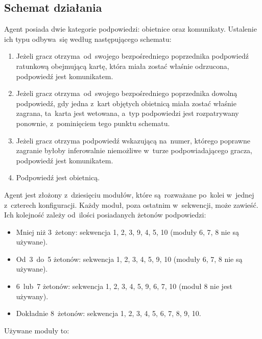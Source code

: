 \documentclass[declaration,shortabstract,inz]{iithesis}
\begin{document}
\subsection*{Schemat działania}

Agent posiada dwie kategorie podpowiedzi: obietnice oraz komunikaty. Ustalenie ich typu odbywa~się według następującego schematu:

\begin{enumerate}
	\item Jeżeli gracz otrzyma od~swojego bezpośredniego poprzednika podpowiedź ratunkową obejmującą kartę, która miała zostać właśnie odrzucona, podpowiedź jest komunikatem.
	\item Jeżeli gracz otrzyma od~swojego bezpośredniego poprzednika dowolną podpowiedź, gdy jedna z~kart objętych obietnicą miała zostać właśnie zagrana, ta~karta jest wetowana, a~typ podpowiedzi jest rozpatrywany ponownie, z~pominięciem tego punktu schematu.
	\item Jeżeli gracz otrzyma podpowiedź wskazującą na~numer, którego poprawne zagranie byłoby inferowalnie niemożliwe w~turze podpowiadającego gracza, podpowiedź jest komunikatem.
	\item Podpowiedź jest obietnicą.
\end{enumerate}

Agent jest złożony z~dziesięciu modułów, które są~rozważane po~kolei w~jednej z~czterech konfiguracji. Każdy moduł, poza ostatnim w~sekwencji, może zawieść. Ich kolejność zależy od~ilości posiadanych żetonów podpowiedzi:

\begin{itemize}
	\item Mniej niż 3~żetony: sekwencja 1, 2, 3, 9, 4, 5, 10 (moduły 6, 7, 8 nie są używane).
	\item Od~3~do~5 żetonów: sekwencja 1, 2, 3, 4, 5, 9, 10 (moduły 6, 7, 8 nie są używane).
	\item 6~lub~7 żetonów: sekwencja 1, 2, 3, 4, 5, 9, 6, 7, 10 (moduł 8 nie jest używany).
	\item Dokładnie 8~żetonów: sekwencja 1, 2, 3, 4, 5, 6, 7, 8, 9, 10.
\end{itemize}
Używane moduły to:
\end{document}
